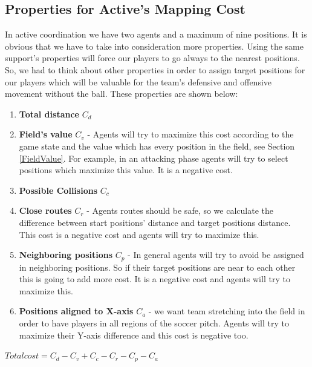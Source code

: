 \subsection{Properties for Active's Mapping Cost}
In active coordination we have two agents and a maximum of nine positions. It is obvious that we have to take into consideration more properties. Using the same support's properties will force our players to go always to the nearest positions. So, we had to think about other properties in order to assign target positions for our players which will be valuable for the team's defensive and offensive movement without the ball. These properties are shown below:
\begin{enumerate}
\item \textbf{Total distance }$C_{d}$
\item \textbf{Field's value }$C_{v}$ - Agents will try to maximize this cost according to the game state and the value which has every position in the field, see Section \ref{FieldValue}. For example, in an attacking phase agents will try to select positions which maximize this value. It is a negative cost.
\item \textbf{Possible Collisions }$C_{c}$
\item \textbf{Close routes }$C_{r}$ - Agents routes should be safe, so we calculate the difference between start positions' distance and target positions distance. This cost is a negative cost and agents will try to maximize this.
\item \textbf{Neighboring positions }$C_{p}$ - In general agents will try to avoid be assigned in neighboring positions. So if their target positions are near to each other this is going to add more cost. It is a negative cost and agents will try to maximize this.
\item \textbf{Positions aligned to X-axis }$C_{a}$ - we want team stretching into the field in order to have players in all regions of the soccer pitch. Agents will try to maximize their Y-axis difference and this cost is negative too. 
\end{enumerate}
\begin{center}
$Total cost = C_{d}-C_{v}+C_{c}-C_{r}-C_{p}-C_{a}$
\end{center}
